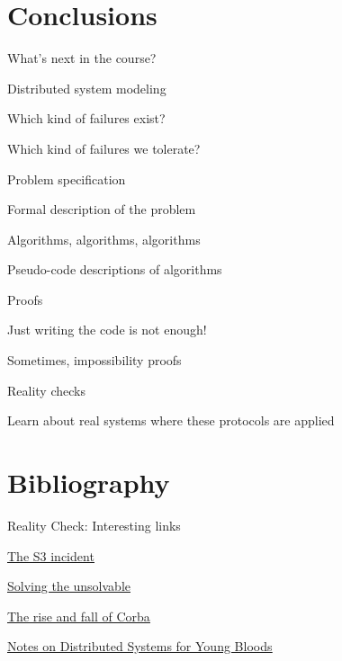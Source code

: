 \section{Conclusions}

\begin{frame}{What's next in the course?}
\BI
\item Distributed system modeling
\BI
\item Which kind of failures exist? 
\item Which kind of failures we tolerate?
\EI
\bigskip
\item Problem specification
\BI
\item Formal description of the problem
\EI
\item Algorithms, algorithms, algorithms
\BI
\item Pseudo-code descriptions of algorithms
\EI
\bigskip
\item Proofs
\BI
\item Just writing the code is not enough!
\item Sometimes, impossibility proofs
\EI
\bigskip
\item Reality checks
\BI
\item Learn about real systems where these protocols are applied
\EI
\EI
\end{frame}


\section{Bibliography}

\ReadingMaterial


\begin{PlainFrame}{Reality Check: Interesting links}

\BI
\item \href{http://status.aws.amazon.com/s3-20080720.html}{\underline{The S3 incident}}
\item \href{http://cacm.acm.org/magazines/2011/7/109895-solving-the-unsolvable/fulltext}{\underline{Solving the unsolvable}}
\item \href{http://queue.acm.org/detail.cfm?id=1142044}{\underline{The rise and fall of Corba}}
\item \href{https://www.somethingsimilar.com/2013/01/14/notes-on-distributed-systems-for-young-bloods/}{\underline{Notes on Distributed Systems for Young Bloods}}
\EI

\end{PlainFrame}


 

